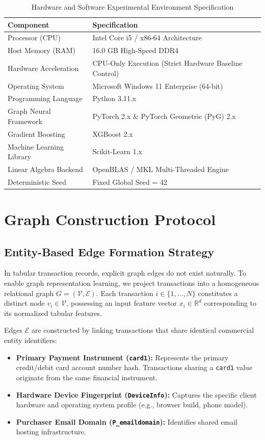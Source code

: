 \documentclass[11pt,a4paper]{report}
\begin{document}
\begin{table}[H]
\centering
\caption{Hardware and Software Experimental Environment Specification}
\label{tab:hardware_specs}
\begin{tabular}{ll}
\toprule
\textbf{Component} & \textbf{Specification} \\
\midrule
Processor (CPU) & Intel Core i5 / x86-64 Architecture \\
Host Memory (RAM) & 16.0 GB High-Speed DDR4 \\
Hardware Acceleration & CPU-Only Execution (Strict Hardware Baseline Control) \\
Operating System & Microsoft Windows 11 Enterprise (64-bit) \\
Programming Language & Python 3.11.x \\
Graph Neural Framework & PyTorch 2.x \& PyTorch Geometric (PyG) 2.x \\
Gradient Boosting & XGBoost 2.x \\
Machine Learning Library & Scikit-Learn 1.x \\
Linear Algebra Backend & OpenBLAS / MKL Multi-Threaded Engine \\
Deterministic Seed & Fixed Global Seed = 42 \\
\bottomrule
\end{tabular}
\end{table}

\newpage
\section{Graph Construction Protocol}

\subsection{Entity-Based Edge Formation Strategy}
In tabular transaction records, explicit graph edges do not exist naturally. To enable graph representation learning, we project transactions into a homogeneous relational graph $G = (\mathcal{V}, \mathcal{E})$. Each transaction $i \in \{1, \dots, N\}$ constitutes a distinct node $v_i \in \mathcal{V}$, possessing an input feature vector $x_i \in \mathbb{R}^d$ corresponding to its normalized tabular features.

Edges $\mathcal{E}$ are constructed by linking transactions that share identical commercial entity identifiers:
\begin{itemize}
    \item \textbf{Primary Payment Instrument (\texttt{card1}):} Represents the primary credit/debit card account number hash. Transactions sharing a \texttt{card1} value originate from the same financial instrument.
    \item \textbf{Hardware Device Fingerprint (\texttt{DeviceInfo}):} Captures the specific client hardware and operating system profile (e.g., browser build, phone model).
    \item \textbf{Purchaser Email Domain (\texttt{P\_emaildomain}):} Identifies shared email hosting infrastructure.
\end{itemize}
\end{document}
